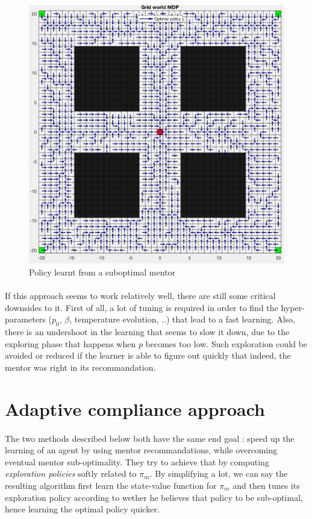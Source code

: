 \documentclass[a4paper]{report}
\begin{document}
{{{{			\begin{figure}[h!]
				\begin{center}
					\includegraphics[width=0.7\linewidth]{learnt_from_mentor}
					\caption{Policy learnt from a suboptimal mentor}
					\label{fig::learnt_from_mentor}
				\end{center}
			\end{figure}


		}		
		
		\paragraph{} If this approach seems to work relatively well, there are still some critical downsides to it. First of all, a lot of tuning is required in order to find the hyper-parameters ($p_0$, $\beta$, temperature evolution, ..) that lead to a fast learning. Also, there is an undershoot in the learning that seems to slow it down, due to the exploring phase that happens when $p$ becomes too low.  Such exploration could be avoided or reduced if the learner is able to figure out quickly that indeed, the mentor was right in its recommandation.
		
	}
	
	\section{Adaptive compliance approach}
	{	
	
		\paragraph{} The two methods described below both have the same end goal : speed up the learning of an agent by using mentor recommandations, while overcoming eventual mentor sub-optimality.  They try to achieve that by computing \emph{exploration policies} softly related to $\pi_m$. By simplifying a lot, we can say the resulting algorithm first learn the state-value function for $\pi_m$ and then tunes its exploration policy according to wether he believes that policy to be sub-optimal, hence learning the optimal policy quicker. 
		
}}}
\end{document}
